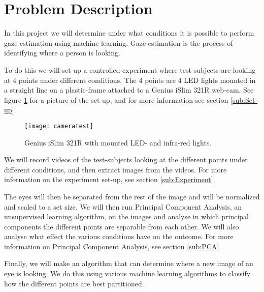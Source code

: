 \section{Problem Description}
In this project we will determine under what conditions it is possible to perform gaze estimation using machine learning.
Gaze estimation is the process of identifying where a person is looking.

To do this we will set up a controlled experiment where test-subjects are looking at 4 points under different conditions.
The 4 points are 4 LED lights mounted in a straight line on a plastic-frame attached to a Genius iSlim 321R web-cam.
See figure \ref{fig:webcamsetup} for a picture of the set-up, and for more information see section \ref{sub:Set-up}.

\begin{figure}[h!]
\centering
\texttt{[image: cameratest]}
\caption{Genius iSlim 321R with mounted LED- and infra-red lights.}
\label{fig:webcamsetup}
\end{figure}

We will record videos of the test-subjects looking at the different points under different conditions, and then extract images from the videos.
For more information on the experiment set-up, see section \ref{sub:Experiment}.

The eyes will then be separated from the rest of the image and will be normalized and scaled to a set size.
We will then run Principal Component Analysis, an unsupervised learning algorithm, on the images and analyse in which principal components the different points are separable from each other.
We will also analyse what effect the various conditions have on the outcome. %
For more information on Principal Component Analysis, see section \ref{sub:PCA}.

Finally, we will make an algorithm that can determine where a new image of an eye is looking.
We do this using various machine learning algorithms to classify how the different points are best partitioned.


